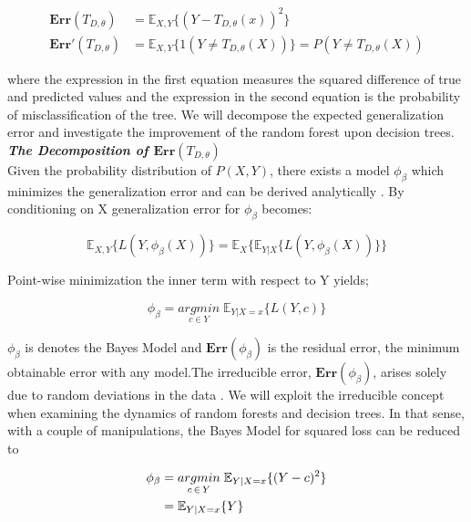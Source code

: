\begin{align}
	\boldsymbol{Err}(T_{D,\theta}) & = \mathbb{E}_{X,Y}\{ (Y - T_{D, \theta}(x))^2 \} \\
	\boldsymbol{Err'}(T_{D,\theta}) & = \mathbb{E}_{X,Y}\{ 1(Y \neq T_{D, \theta}(X)) \}
	= P(Y \neq T_{D, \theta}(X))
\end{align}

where the expression in the first equation measures the squared difference of true and predicted values
and the expression in the second equation is the probability of misclassification of the tree. 
We will decompose the expected generalization error and investigate the improvement of the random forest upon 
decision trees.
\vspace{2mm}
\\
\textbf{\emph{The Decomposition of $\boldsymbol{Err}(T_{D,\theta})$}}\\
Given the probability distribution of $P(X,Y)$, there exists a model $\phi_{\beta}$ which minimizes the generalization error 
and can be derived analytically \cite{louppe2014understanding}. 
By conditioning on X generalization error for $\phi_{\beta}$ becomes:

\begin{equation}
\mathbb{E}_{X,Y} \{L(Y, \phi_{\beta}(X))\} = \mathbb{E}_{X}\{\mathbb{E}_{Y|X}\{L(Y, \phi_{\beta}(X)) \} \}
\end{equation}

Point-wise minimization the inner term with respect to Y yields;

\begin{equation}
\phi_{\beta} = \underset{c \in Y}{argmin} \; \mathbb{E}_{Y|X=x}\{L(Y,c)\}
\end{equation}

$\phi_{\beta}$ is denotes the Bayes Model and $\boldsymbol{Err}(\phi_{\beta})$ is the residual error, 
the minimum obtainable error with any model.The irreducible error, $\boldsymbol{Err}(\phi_{\beta})$, arises solely 
due to random deviations in the 
data \cite{louppe2014understanding}. We will exploit the irreducible concept when examining the dynamics of random forests and 
decision trees. In that sense, with a couple of manipulations, the Bayes Model for squared loss can be reduced to

\begin{align}
\phi_{\beta} & = \underset{c \,\in\, Y}{argmin} \; \mathbb{E}_{Y|X=x}\{(Y-c)^2 \} \notag\\
			 & = \mathbb{E}_{Y|X=x}\{Y\}
\end{align}


